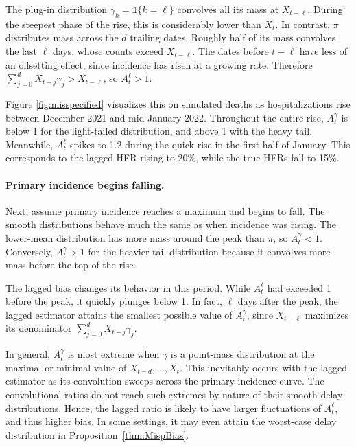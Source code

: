 \documentclass{article}
\begin{document}
The plug-in distribution $\gamma_k=\mathds{1}\{k=\ell\}$ convolves all its mass at $X_{t-\ell}$. 
During the steepest phase of the rise, this is considerably lower than $X_{t}$. %
In contrast, $\pi$ distributes mass across the $d$ trailing dates. Roughly half of its mass convolves the last $\ell$ days, whose counts exceed $X_{t-\ell}$. 
The dates before $t-\ell$ have less of an offsetting effect, since incidence has risen at a growing rate. Therefore $\sum_{j=0}^d X_{t-j}\gamma_j > X_{t-\ell}$, so $A_t^\ell>1$.

Figure \ref{fig:misspecified} visualizes this on simulated deaths as hospitalizations rise between December 2021 and mid-January 2022. 
Throughout the entire rise, $A_t^\gamma$ is below 1 for the light-tailed distribution, and above 1 with the heavy tail.
Meanwhile, $A_t^\ell$ spikes to 1.2 during the quick rise in the first half of January.
This corresponds to the lagged HFR rising to 20\%, while the true HFRs fall to 15\%. 

\paragraph{Primary incidence begins falling.}
Next, assume primary incidence reaches a maximum and begins to fall. The smooth distributions behave much the same as when incidence was rising. The lower-mean distribution has more mass around the peak than $\pi$, so $A_t^\gamma < 1$. Conversely, $A_t^\gamma>1$ for the heavier-tail distribution because it convolves more mass before the top of the rise.

The lagged bias changes its behavior in this period. While $A_t^\ell$ had exceeded 1 before the peak, it quickly plunges below 1. 
In fact, $\ell$ days after the peak, the lagged estimator attains the smallest possible value of $A_t^\gamma$, since $X_{t-\ell}$ maximizes its denominator $\sum_{j=0}^d X_{t-j}\gamma_j$. 

In general, $A_t^\gamma$ is most extreme when $\gamma$ is a point-mass distribution at the maximal or minimal value of $X_{t-d}, \ldots, X_t$. This inevitably occurs with the lagged estimator as its convolution sweeps across the primary incidence curve. The convolutional ratios do not reach such extremes by nature of their smooth delay distributions. Hence, the lagged ratio is likely to have larger fluctuations of $A_t^\ell$, and thus higher bias.
In some settings, it may even attain the worst-case delay distribution in Proposition~\ref{thm:MispBias}. 
\end{document}
